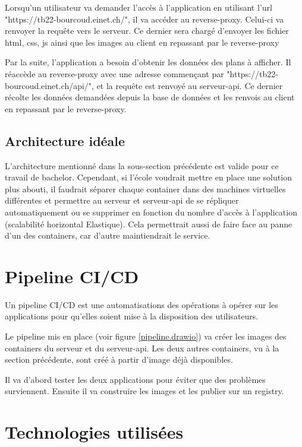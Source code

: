 \documentclass[
    iai, %
    il, %
]{heig-tb}
\begin{document}
Lorsqu'un utilisateur va demander l'accès à l'application en utilisant l'url "https://tb22-bourcoud.einet.ch/", il va accéder au reverse-proxy.
Celui-ci va renvoyer la requête vers le serveur.
Ce dernier sera chargé d'envoyer les fichier \gls{html}, \gls{css}, \gls{js} ainsi que les images au client en repassant par le reverse-proxy

Par la suite, l'application a besoin d'obtenir les données des plans à afficher. Il réaccède au reverse-proxy avec une adresse commençant par "https://tb22-bourcoud.einet.ch/api/",
et la requête est renvoyé au serveur-api. Ce dernier récolte les données demandées depuis la base de données et les renvois au client en repassant par le reverse-proxy.

\subsection{Architecture idéale}
L'architecture mentionné dans la sous-section précédente est valide pour ce travail de bachelor.
Cependant, si l'école voudrait mettre en place une solution plus abouti,
il faudrait séparer chaque container dans des machines virtuelles différentes
et permettre au serveur et serveur-api de se répliquer automatiquement
ou se supprimer en fonction du nombre d'accès à l'application (scalabilité horizontal Elastique).
Cela permettrait aussi de faire face au panne d'un des containers, car d'autre maintiendrait le service.

\section{Pipeline CI/CD}
Un pipeline CI/CD est une automatisations des opérations à opérer sur les applications pour qu'elles soient mise à la disposition des utilisateurs.


Le pipeline mis en place (voir figure \ref{pipeline.drawio}) va créer les images des containers du serveur et du serveur-api.
Les deux autres containers, vu à la section précédente, sont créé à partir d'image déjà disponibles.

Il va d'abord tester les deux applications pour éviter que des problèmes surviennent.
Ensuite il va construire les images et les publier sur un registry.

\section{Technologies utilisées}
\end{document}
